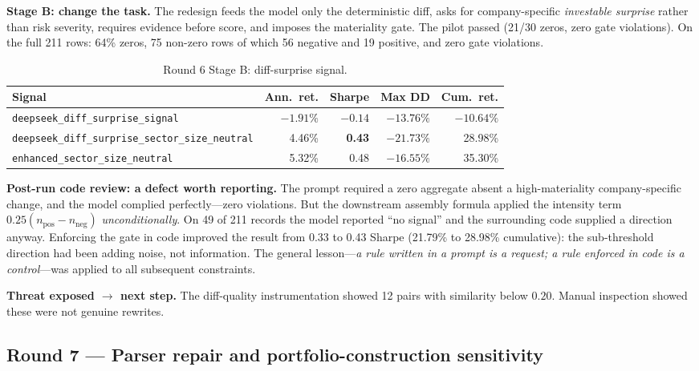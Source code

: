 \documentclass[11pt]{article}
\newcommand{\sig}[1]{\texttt{#1}}
\begin{document}
\textbf{Stage B: change the task.} The redesign feeds the model only the deterministic
diff, asks for company-specific \emph{investable surprise} rather than risk severity,
requires evidence before score, and imposes the materiality gate. The pilot passed
(21/30 zeros, zero gate violations). On the full 211 rows: 64\% zeros, 75 non-zero rows
of which 56 negative and 19 positive, and zero gate violations.

\begin{table}[H]
\centering\small
\caption{Round 6 Stage B: diff-surprise signal.}
\begin{tabular}{l r r r r}
\toprule
\textbf{Signal} & \textbf{Ann.\ ret.} & \textbf{Sharpe} & \textbf{Max DD} & \textbf{Cum.\ ret.} \\
\midrule
\sig{deepseek\_diff\_surprise\_signal}                & $-1.91\%$ & $-0.14$ & $-13.76\%$ & $-10.64\%$ \\
\sig{deepseek\_diff\_surprise\_sector\_size\_neutral} & 4.46\%    & \textbf{0.43} & $-21.73\%$ & 28.98\% \\
\sig{enhanced\_sector\_size\_neutral}                 & 5.32\%    & 0.48 & $-16.55\%$ & 35.30\% \\
\bottomrule
\end{tabular}
\end{table}

\textbf{Post-run code review: a defect worth reporting.} The prompt required a zero
aggregate absent a high-materiality company-specific change, and the model complied
perfectly---zero violations. But the downstream assembly formula applied the intensity
term $0.25(n_{\text{pos}} - n_{\text{neg}})$ \emph{unconditionally}. On 49 of 211 records
the model reported ``no signal'' and the surrounding code supplied a direction anyway.
Enforcing the gate in code improved the result from 0.33 to 0.43 Sharpe
(21.79\% to 28.98\% cumulative): the sub-threshold direction had been adding noise, not
information. The general lesson---\emph{a rule written in a prompt is a request; a rule
enforced in code is a control}---was applied to all subsequent constraints.

\textbf{Threat exposed $\rightarrow$ next step.} The diff-quality instrumentation showed 12
pairs with similarity below $0.20$. Manual inspection showed these were not genuine
rewrites.

\subsection{Round 7 --- Parser repair and portfolio-construction sensitivity}
\label{sec:r7}
\end{document}
